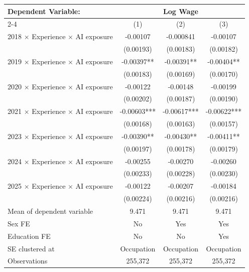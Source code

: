 \def\sym#1{\ifmmode^{#1}\else\(^{#1}\)\fi}
\begin{tabular}{l*{3}{c}}
\toprule
Dependent Variable: & \multicolumn{3}{c}{Log Wage} \\
\cmidrule(lr){2-4}
 & (1) & (2) & (3) \\
\midrule
2018 $\times$ Experience $\times$ AI exposure&    -0.00107   &   -0.000841   &    -0.00107   \\
            &   (0.00193)   &   (0.00183)   &   (0.00182)   \\
2019 $\times$ Experience $\times$ AI exposure&    -0.00397** &    -0.00391** &    -0.00404** \\
            &   (0.00183)   &   (0.00169)   &   (0.00170)   \\
2020 $\times$ Experience $\times$ AI exposure&    -0.00122   &    -0.00148   &    -0.00199   \\
            &   (0.00202)   &   (0.00187)   &   (0.00190)   \\
2021 $\times$ Experience $\times$ AI exposure&    -0.00603***&    -0.00617***&    -0.00622***\\
            &   (0.00168)   &   (0.00163)   &   (0.00157)   \\
2023 $\times$ Experience $\times$ AI exposure&    -0.00390** &    -0.00430** &    -0.00411** \\
            &   (0.00197)   &   (0.00178)   &   (0.00179)   \\
2024 $\times$ Experience $\times$ AI exposure&    -0.00255   &    -0.00270   &    -0.00260   \\
            &   (0.00233)   &   (0.00228)   &   (0.00230)   \\
2025 $\times$ Experience $\times$ AI exposure&    -0.00122   &    -0.00207   &    -0.00184   \\
            &   (0.00224)   &   (0.00216)   &   (0.00216)   \\
\midrule
Mean of dependent variable&       9.471   &       9.471   &       9.471   \\
Sex FE      &          No   &         Yes   &         Yes   \\
Education FE&          No   &          No   &         Yes   \\
SE clustered at&  Occupation   &  Occupation   &  Occupation   \\
Observations&     255,372   &     255,372   &     255,372   \\
\bottomrule
\end{tabular}
